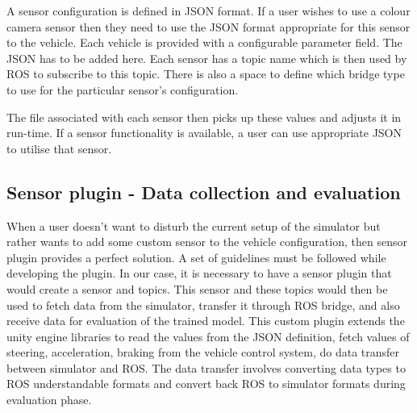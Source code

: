 \fi
A sensor configuration is defined in JSON format. If a user wishes to use a colour camera
sensor then they need to use the JSON format appropriate for this sensor to the vehicle.
Each vehicle is provided with a configurable parameter field. The JSON has to be added
here. Each sensor has a topic name which is then used by ROS to subscribe to this topic.
There is also a space to define which bridge type to use for the particular sensor's
configuration.

The file associated with each sensor then picks up these values and adjusts it in
run-time. If a sensor functionality is available, a user can use appropriate JSON to
utilise that sensor.
\subsection{Sensor plugin - Data collection and evaluation}
When a user doesn't want to disturb the current setup of the simulator but rather wants to add
some custom sensor to the vehicle configuration, then sensor plugin provides a perfect
solution. A set of guidelines must be followed while developing the plugin. In our case,
it is necessary to have a sensor plugin that would create a sensor and topics. This sensor
and these topics would then be used to fetch data from the simulator, transfer it through ROS bridge, and also receive
data for evaluation of the trained model. This custom plugin
extends the unity engine libraries to read the values from the JSON definition, fetch
values of steering, acceleration, braking from the vehicle control system, do
data transfer between simulator and ROS. The data transfer involves converting data types
to ROS understandable formats and convert back ROS to simulator formats during evaluation
phase.


